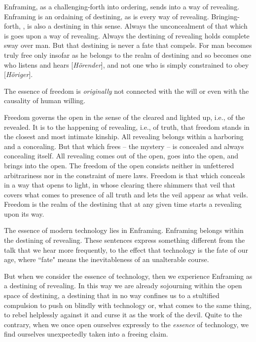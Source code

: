 Enframing, as a challenging-forth into ordering, sends into a way of revealing. Enframing is an ordaining of destining, as is every way of revealing. Bringing-forth, , is also a destining in this sense. Always the unconcealment of that which is goes upon a way of revealing. Always the destining of revealing holds complete sway over man. But that destining is never a fate that compels. For man becomes truly free only insofar as he belongs to the realm of destining and so becomes one who listens and hears [\textit{H\"{o}render}], and not one who is simply constrained to obey [\textit{H\"{o}riger}].

The essence of freedom is \textit{originally} not connected with the will or even with the causality of human willing.

Freedom governs the open in the sense of the cleared and lighted up, i.e., of the revealed. It is to the happening of revealing, i.e., of truth, that freedom stands in the closest and most intimate kinship. All revealing belongs within a harboring and a concealing. But that which frees -- the mystery -- is concealed and always concealing itself. All revealing comes out of the open, goes into the open, and brings into the open. The freedom of the open consists neither in unfettered arbitrariness nor in the constraint of mere laws. Freedom is that which conceals in a way that opens to light, in whose clearing there shimmers that veil that covers what comes to presence of all truth and lets the veil appear as what veils. Freedom is the realm of the destining that at any given time starts a revealing upon its way.

The essence of modern technology lies in Enframing. Enframing belongs within the destining of revealing. These sentences express something different from the talk that we hear more frequently, to the effect that technology is the fate of our age, where ``fate" means the inevitableness of an unalterable course.

But when we consider the essence of technology, then we experience Enframing as a destining of revealing. In this way we are already sojourning within the open space of destining, a destining that in no way confines us to a stultified compulsion to push on blindly with technology or, what comes to the same thing, to rebel helplessly against it and curse it as the work of the devil. Quite to the contrary, when we once open ourselves expressly to the \textit{essence} of technology, we find ourselves unexpectedly taken into a freeing claim.

